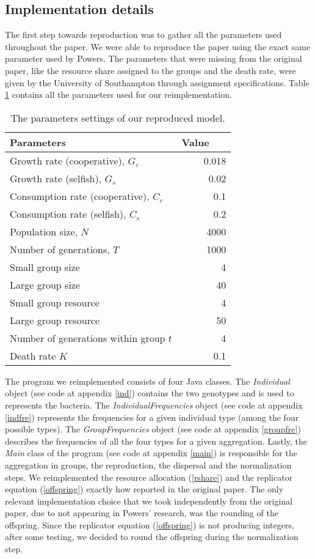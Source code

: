 \documentclass[runningheads]{llncs}
\begin{document}
\subsection{Implementation details}
The first step towards reproduction was to gather all the parameters
used throughout the paper. We were able to reproduce the paper using
the exact same parameter used by Powers. The parameters that were
missing from the original paper, like the resource share assigned to
the groups and the death rate, were given by the University of
Southampton through assignment specifications. Table
\ref{tab_parameters} contains all the parameters used for our
reimplementation.
\begin{table}
\caption{The parameters settings of our reproduced model.}\label{tab_parameters}
\begin{tabular}{|l|r|}
\hline
\textbf{Parameters}~~~ & \textbf{Value}~~~ \\
\hline
Growth rate (cooperative), $G_c$ & 0.018 \\
\hline
Growth rate (selfish), $G_s$ & 0.02 \\
\hline
Consumption rate (cooperative), $C_c$ & 0.1 \\
\hline
Consumption rate (selfish), $C_s$ & 0.2 \\
\hline
Population size, $N$ & 4000 \\
\hline
Number of generations, $T$ & 1000 \\
\hline
Small group size & 4 \\
\hline
Large group size & 40 \\
\hline
Small group resource & 4 \\
\hline
Large group resource & 50 \\
\hline
Number of generations within group $t$ & 4 \\
\hline
Death rate $K$ & 0.1 \\
\hline
\end{tabular}
\end{table}
The program we reimplemented consists of four Java classes. The
\textit{Individual} object (see code at appendix \ref{ind}) contains the two
genotypes and is used to represents the bacteria. The
\textit{IndividualFrequencies} object (see code at appendix \ref{indfre})
represents the frequencies for a given individual type (among the four
possible types). The \textit{GroupFrequencies} object (see code at appendix
\ref{groupfre}) describes the frequencies of all the four types for a
given aggregation. Lastly, the \textit{Main} class of the program (see
code at appendix \ref{main}) is responsible for the aggregation in
groups, the reproduction, the dispersal and the
normalization steps. We reimplemented the resource allocation
(\ref{rshare}) and the replicator equation (\ref{offspring}) exactly
how reported in the original paper. The only relevant implementation
choice that we took independently from the original paper, due to not
appearing in Powers' research, was the rounding of the offspring. Since
the replicator equation (\ref{offspring}) is not producing integers,
after some testing, we decided to round the offspring during the
normalization step.
\end{document}
